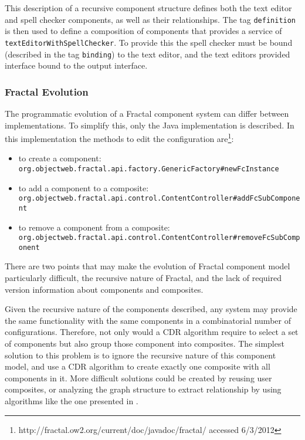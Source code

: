 This description of a recursive component structure defines both the text editor and spell checker components, as well as their relationships.
The tag \texttt{definition} is then used to define a composition of components that provides a service of \texttt{textEditorWithSpellChecker}.
To provide this the spell checker must be bound (described in the tag \texttt{binding}) to the text editor,
and the text editors provided interface bound to the output interface. 

\subsubsection{Fractal Evolution}
The programmatic evolution of a Fractal component system can differ between implementations.
To simplify this, only the Java implementation is described. 
In this implementation the methods to edit the configuration are\footnote{http://fractal.ow2.org/current/doc/javadoc/fractal/ accessed 6/3/2012}:
\begin{itemize}
  \item to create a component: \\ \texttt{org.objectweb.fractal.api.factory.GenericFactory}\verb+#+\texttt{newFcInstance}
  \item to add a component to a composite: \\ \texttt{org.objectweb.fractal.api.control.ContentController}\verb+#+\texttt{addFcSubComponent}
  \item to remove a component from a composite: \\ \texttt{org.objectweb.fractal.api.control.ContentController}\verb+#+\texttt{removeFcSubComponent}
\end{itemize}

There are two points that may make the evolution of Fractal component model particularly difficult,
the recursive nature of Fractal, and the lack of required version information about components and composites.

Given the recursive nature of the components described, any system may provide the same functionality with the same components in a combinatorial number of configurations.
Therefore, not only would a CDR algorithm require to select a set of components but also group those component into composites.
The simplest solution to this problem is to ignore the recursive nature of this component model,
and use a CDR algorithm to create exactly one composite with all components in it.
More difficult solutions could be created by reusing user composites,
or analyzing the graph structure to extract relationship by using algorithms like the one presented in \citep{dietrich2008cluster}.

